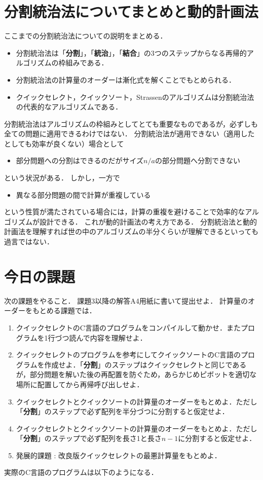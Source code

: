 \documentclass[a4paper,twoside,onecolumn,openany,article]{memoir}
\theoremstyle{remark}
\begin{document}
\section{分割統治法についてまとめと動的計画法}
ここまでの分割統治法についての説明をまとめる．
\begin{itemize}
\item 分割統治法は「\textbf{分割}」，「\textbf{統治}」，「\textbf{結合}」の3つのステップからなる再帰的アルゴリズムの枠組みである．
\item 分割統治法の計算量のオーダーは漸化式を解くことでもとめられる．
\item クイックセレクト，クイックソート，Strassenのアルゴリズムは分割統治法の代表的なアルゴリズムである．
\end{itemize}
分割統治法はアルゴリズムの枠組みとしてとても重要なものであるが，必ずしも全ての問題に適用できるわけではない．
分割統治法が適用できない（適用したとしても効率が良くない）場合として
\begin{itemize}
\item 部分問題への分割はできるのだがサイズ$n/a$の部分問題へ分割できない
\end{itemize}
という状況がある．
しかし，一方で
\begin{itemize}
\item 異なる部分問題の間で計算が重複している
\end{itemize}
という性質が満たされている場合には，計算の重複を避けることで効率的なアルゴリズムが設計できる．
これが動的計画法の考え方である．
分割統治法と動的計画法を理解すれば世の中のアルゴリズムの半分くらいが理解できるといっても過言ではない．

\section{今日の課題}
次の課題をやること．
課題3以降の解答A4用紙に書いて提出せよ．
計算量のオーダーをもとめる課題では．
\begin{enumerate}
\item クイックセレクトのC言語のプログラムをコンパイルして動かせ．またプログラムを1行づつ読んで内容を理解せよ．
\item クイックセレクトのプログラムを参考にしてクイックソートのC言語のプログラムを作成せよ．「\textbf{分割}」のステップはクイックセレクトと同じであるが，部分問題を解いた後の再配置を防ぐため，あらかじめピボットを適切な場所に配置してから再帰呼び出しせよ．
\item クイックセレクトとクイックソートの計算量のオーダーをもとめよ．ただし「\textbf{分割}」のステップで必ず配列を半分づつに分割すると仮定せよ．
\item クイックセレクトとクイックソートの計算量のオーダーをもとめよ．ただし「\textbf{分割}」のステップで必ず配列を長さ1と長さ$n-1$に分割すると仮定せよ．
\item 発展的課題 : 改良版クイックセレクトの最悪計算量をもとめよ．
\end{enumerate}
実際のC言語のプログラムは以下のようになる．

\end{document}
